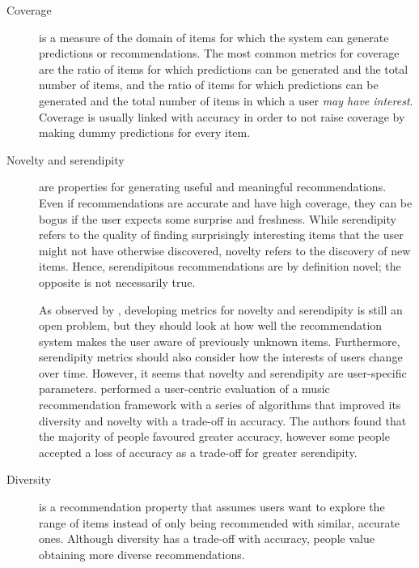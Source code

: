 \begin{description}
	
	\item [Coverage] is a measure of the domain of items for which the system can generate predictions or recommendations. The most common metrics for coverage are the ratio of items for which predictions can be generated and the total number of items, and the ratio of items for which predictions can be generated and the total number of items in which a user \emph{may have interest}. Coverage is usually linked with accuracy in order to not raise coverage by making dummy predictions for every item.  
	
	\item [Novelty and serendipity] are properties for generating useful and meaningful recommendations. Even if recommendations are accurate and have high coverage, they can be bogus if the user expects some surprise and freshness. While serendipity refers to the quality of finding surprisingly interesting items that the user might not have otherwise discovered, novelty refers to the discovery of new items. Hence, serendipitous recommendations are by definition novel; the opposite is not necessarily true. 

	As observed by \textcite{herlocker04evaluating}, developing metrics for novelty and serendipity is still an open problem, but they should look at how well the recommendation system makes the user aware of previously unknown items. Furthermore, serendipity metrics should also consider how the interests of users change over time.
	However, it seems that novelty and serendipity are user-specific parameters. \textcite{zhang12auralist} performed a user-centric evaluation of a music recommendation framework with a series of algorithms that improved its diversity and novelty with a trade-off in accuracy. The authors found that the majority of people favoured greater accuracy, however some people accepted a loss of accuracy as a trade-off for greater serendipity. 

	\item [Diversity] is a recommendation property that assumes users want to explore the range of items instead of only being recommended with similar, accurate ones. Although diversity has a trade-off with accuracy, people value obtaining more diverse recommendations. 


\end{description}
